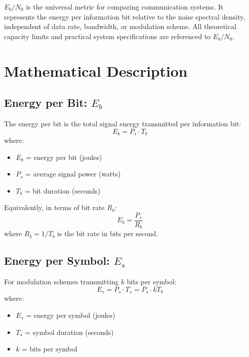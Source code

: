 \begin{keyconcept}
\textbf{$E_b/N_0$} is the universal metric for comparing communication systems. It represents the energy per information bit relative to the noise spectral density, independent of data rate, bandwidth, or modulation scheme. All theoretical capacity limits and practical system specifications are referenced to $E_b/N_0$.
\end{keyconcept}

\section{Mathematical Description}

\subsection{Energy per Bit: $E_b$}

The energy per bit is the total signal energy transmitted per information bit:
\begin{equation}
E_b = P_s \cdot T_b
\end{equation}
where:
\begin{itemize}
\item $E_b$ = energy per bit (joules)
\item $P_s$ = average signal power (watts)
\item $T_b$ = bit duration (seconds)
\end{itemize}

Equivalently, in terms of bit rate $R_b$:
\begin{equation}
E_b = \frac{P_s}{R_b}
\end{equation}
where $R_b = 1/T_b$ is the bit rate in bits per second.

\subsection{Energy per Symbol: $E_s$}

For modulation schemes transmitting $k$ bits per symbol:
\begin{equation}
E_s = P_s \cdot T_s = P_s \cdot k T_b
\end{equation}
where:
\begin{itemize}
\item $E_s$ = energy per symbol (joules)
\item $T_s$ = symbol duration (seconds)
\item $k$ = bits per symbol
\end{itemize}

